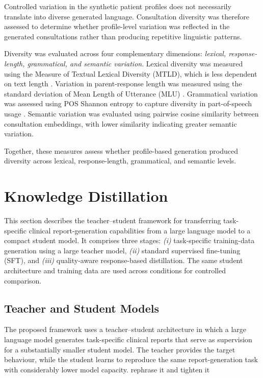\documentclass[ %
                    author={Aman Kumar Singh},
                supervisor={Dr. Edwin Simpson},
                    degree={MSc},
                     title={Quality-Aware Knowledge Distillation of Large Language Models for Efficient Personalised Clinical Report Generation},
                  subtitle={},
                      type={},
                      year={2021}]{dissertation}
\begin{document}
Controlled variation in the synthetic patient profiles does not necessarily
translate into diverse generated language. Consultation diversity was therefore
assessed to determine whether profile-level variation was reflected in the
generated consultations rather than producing repetitive linguistic patterns.

Diversity was evaluated across four complementary dimensions:
\textit{lexical, response-length, grammatical, and semantic variation}.
Lexical diversity was measured using the Measure of Textual Lexical
Diversity (MTLD), which is less dependent on text length
\cite{mccarthy_mtld_2010}. Variation in parent-response length was measured
using the standard deviation of Mean Length of Utterance (MLU)
\cite{potratz_measurement_2022}. Grammatical variation was assessed using
POS Shannon entropy to capture diversity in part-of-speech usage
\cite{arora_estimating_2022}. Semantic variation was evaluated using pairwise
cosine similarity between consultation embeddings, with lower similarity
indicating greater semantic variation.

Together, these measures assess whether profile-based generation produced
diversity across lexical, response-length, grammatical, and semantic levels.
\section{Knowledge Distillation}
\label{sec:teacher_student_models}

This section describes the teacher--student framework for transferring
task-specific clinical report-generation capabilities from a large language
model to a compact student model. It comprises three stages:
\textit{(i)} task-specific training-data generation using a large teacher
model, \textit{(ii)} standard supervised fine-tuning (SFT), and
\textit{(iii)} quality-aware response-based distillation. The same student architecture and training data are
used across conditions for controlled comparison.
\subsection{Teacher and Student Models}
\label{sec:teacher_student_models}
The proposed framework uses a teacher--student architecture in which a
large language model generates task-specific clinical reports that serve
as supervision for a substantially smaller student model. The teacher
provides the target behaviour, while the student learns to reproduce the
same report-generation task with considerably lower model capacity. rephrase it and tighten it 
\end{document}
